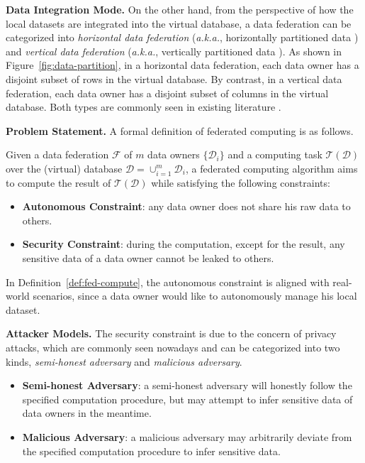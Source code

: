 \documentclass[11pt]{article}
\newcommand{\aka}{\textit{a.k.a.},\xspace}
\newcommand\figref[1]{Figure~\ref{#1}}
\newcommand\defref[1]{Definition~\ref{#1}}
\newcommand{\fakeparagraph}[1]{\vspace{1mm}\noindent\textbf{#1.}}
\newcommand{\F}{\mathcal{F}}
\newcommand{\D}{\mathcal{D}}
\newcommand{\T}{\mathcal{T}}
\begin{document}
\fakeparagraph{Data Integration Mode}
On the other hand, from the perspective of how the local datasets are integrated into the virtual database,
a data federation can be categorized into \textit{horizontal data federation} (\aka horizontally partitioned data \cite{DBLP:conf/kdd/VaidyaC02}) and \textit{vertical data federation} (\aka vertically partitioned data \cite{DBLP:journals/tkde/KantarciogluC04}).
As shown in \figref{fig:data-partition}, in a horizontal data federation, each data owner has a disjoint subset of rows in the virtual database. By contrast, in a vertical data federation, each data owner has a disjoint subset of columns in the virtual database.
Both types are commonly seen in existing literature \cite{DBLP:journals/tist/YangLCT19}.

\fakeparagraph{Problem Statement} A formal definition of federated computing is as follows.

\begin{definition}\label{def:fed-compute}
	Given a data federation $\F$ of $m$ data owners $\{\D_i\}$ and a computing task $\T(\D)$ over the (virtual) database $\D=\cup_{i=1}^{m}{\D_i}$,
	a federated computing algorithm aims to compute the result of $\T(\D)$ while satisfying the following constraints:
	\begin{itemize}
		\item \textbf{Autonomous Constraint}: any data owner does not share his raw data to others.
		\item \textbf{Security Constraint}: during the computation, except for the result, any sensitive data of a data owner cannot be leaked to others.
	\end{itemize}
\end{definition}

In \defref{def:fed-compute}, the autonomous constraint is aligned with real-world scenarios,
since a data owner would like to autonomously manage his local dataset.

\fakeparagraph{Attacker Models}
The security constraint is due to the concern of privacy attacks, which are commonly seen nowadays and can be categorized into two kinds, \textit{semi-honest adversary} and \textit{malicious adversary}.
\begin{itemize}
	\item \textbf{Semi-honest Adversary}: a semi-honest adversary will honestly follow the specified computation procedure,
	but may attempt to infer sensitive data of data owners in the meantime.
	\item \textbf{Malicious Adversary}: a malicious adversary may arbitrarily deviate from the specified computation procedure to infer sensitive data.
\end{itemize}
\end{document}
